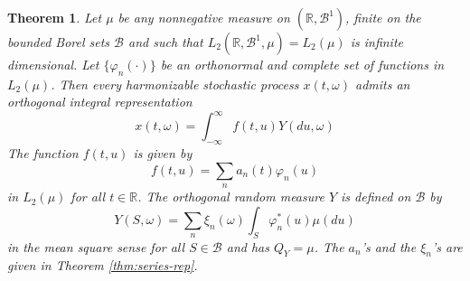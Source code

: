 \documentclass{article}
\newtheorem{theorem}{Theorem}
\begin{document}
\begin{theorem}
  \label{thm:integral-rep}Let $\mu$ be any nonnegative measure on
  $(\mathbb{R}, \mathscr{B}^1)$, finite on the bounded Borel sets
  $\mathscr{B}$ and such that $L_2 (\mathbb{R}, \mathscr{B}^1, \mu) = L_2
  (\mu)$ is infinite dimensional. Let $\{\varphi_n (\cdot)\}$ be an
  orthonormal and complete set of functions in $L_2 (\mu)$. Then every
  harmonizable stochastic process $x (t, \omega)$ admits an orthogonal
  integral representation
  \begin{equation}
    x (t, \omega) = \int_{- \infty}^{\infty} f (t, u) Y (du, \omega)
    \label{eq:integral-rep-thm}
  \end{equation}
  The function $f (t, u)$ is given by
  \begin{equation}
    f (t, u) = \sum_n a_n (t) \varphi_n (u) \label{eq:f-integral}
  \end{equation}
  in $L_2 (\mu)$ for all $t \in \mathbb{R}$. The orthogonal random measure $Y$
  is defined on $\mathscr{B}$ by
  \begin{equation}
    Y (S, \omega) = \sum_n \xi_n (\omega)  \int_S \varphi_n^{\ast} (u) \mu
    (du) \label{eq:Y-thm}
  \end{equation}
  in the mean square sense for all $S \in \mathscr{B}$ and has $Q_Y = \mu$.
  The $a_n$'s and the $\xi_n$'s are given in Theorem \ref{thm:series-rep}.
\end{theorem}
\end{document}
